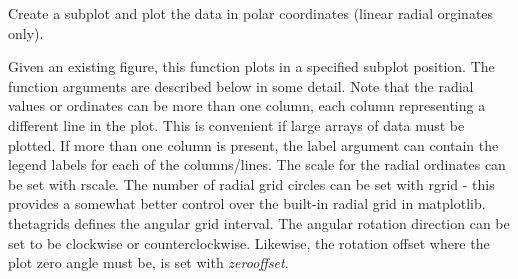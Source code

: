 \documentclass[a4paper,10pt,english]{sphinxmanual}
\begin{document}
\begin{fulllineitems}
\begin{fulllineitems}
\begin{quote}
\begin{description}
\end{description}
\end{quote}

\end{fulllineitems}


\begin{fulllineitems}
\label{ryplot:pyradi.ryplot.Plotter.polar}
Create a subplot and plot the data in polar coordinates (linear radial orginates only).

Given an existing figure, this function plots in a specified subplot position.
The function arguments are described below in some detail. Note that the radial values
or ordinates can be more than one column, each column representing a different
line in the plot. This is convenient if large arrays of data must be plotted. If more
than one column is present, the label argument can contain the legend labels for
each of the columns/lines.  The scale for the radial ordinates can be set with rscale.
The number of radial grid circles can be set with rgrid - this provides a somewhat
better control over the built-in radial grid in matplotlib. thetagrids defines the angular
grid interval.  The angular rotation direction can be set to be clockwise or
counterclockwise. Likewise, the rotation offset where the plot zero angle must be,
is set with \emph{zerooffset}.


\end{fulllineitems}
\end{fulllineitems}
\end{document}
